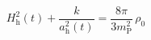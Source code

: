 \begin{equation}                                      \label{fried}
 H_{\text{h}}^{2}(t)+\frac{k}{a_{\text{h}}^2(t)}
=\frac{8\pi}{3m_{\text{P}}^2}\,\rho_0
\end{equation}

